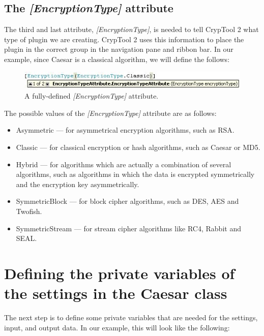 \subsection{The \textit{[EncryptionType]} attribute}
\label{sec:TheEncryptionTypeAttribute}

The third and last attribute, \textit{[EncryptionType]}, is needed to tell CrypTool 2 what type of plugin we are creating. CrypTool 2 uses this information to place the plugin in the correct group in the navigation pane and ribbon bar. In our example, since Caesar is a classical algorithm, we will define the follows:

\begin{figure}[h]
	\centering
		\includegraphics[width=.90\textwidth]{figures/attribute_encryptiontype_new.jpg}
	\caption{A fully-defined \textit{[EncryptionType]} attribute.}
	\label{fig:attribute_encryption_type}
\end{figure}

The possible values of the \textit{[EncryptionType]} attribute are as follows:

\begin{itemize}
	\item Asymmetric --- for asymmetrical encryption algorithms, such as RSA.
	\item Classic --- for classical encryption or hash algorithms, such as Caesar or MD5.
	\item Hybrid --- for algorithms which are actually a combination of several algorithms, such as algorithms in which the data is encrypted symmetrically and the encryption key asymmetrically.
	\item SymmetricBlock --- for block cipher algorithms, such as DES, AES and Twofish.
	\item SymmetricStream --- for stream cipher algorithms like RC4, Rabbit and SEAL.
\end{itemize}

\section{Defining the private variables of the settings in the Caesar class}
\label{sec:DefiningThePrivateVariablesOfTheSettingsInTheCaesarClass}

The next step is to define some private variables that are needed for the settings, input, and output data. In our example, this will look like the following:

